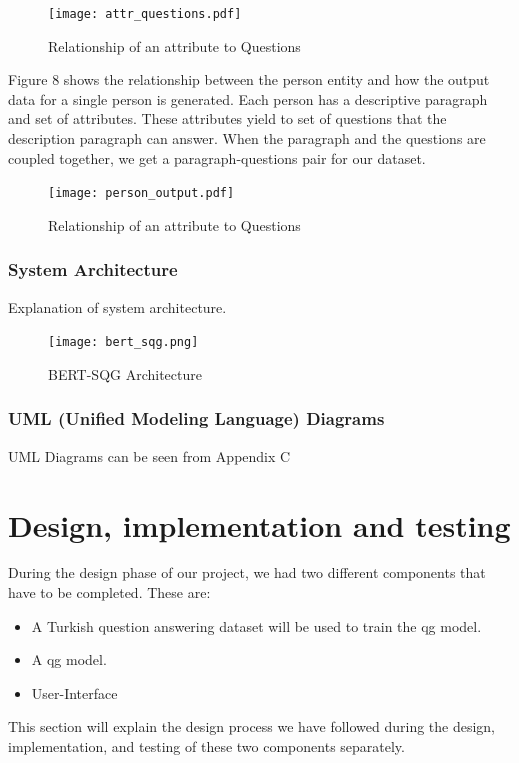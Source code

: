 \documentclass{mefsdp}
\begin{document}
	\begin{figure}[h]
		\centering
		\texttt{[image: attr\_questions.pdf]}
		\caption{Relationship of an attribute to Questions\label{attr-qg}}
	\end{figure}
	
	
	Figure 8 shows the relationship between the person entity and how the output data for a single person is generated. Each person has a descriptive paragraph and set of attributes. These attributes yield to set of questions that the description paragraph can answer. When the paragraph and the questions are coupled together, we get a paragraph-questions pair for our dataset. \newline \par
	
	\begin{figure}[h]
		\centering
		\texttt{[image: person\_output.pdf]}
		\caption{Relationship of an attribute to Questions}
	\end{figure}
	
	\newpage
	\subsubsection{System Architecture }
	Explanation of system architecture.
	\begin{figure}[h!]
		\centering
		\texttt{[image: bert\_sqg.png]}
		\caption{BERT-SQG Architecture \cite{chan-fan-2019-bert}\label{bertsqg-arch}}
	\end{figure}
	
	\subsubsection{UML (Unified Modeling Language) Diagrams}
	UML Diagrams can be seen from Appendix C
	
	\section{Design, implementation and testing}
	During the design phase of our project, we had two different components that have to be completed. These are:
	\begin{itemize}
		\item A Turkish question answering dataset will be used to train the \gls{qg} model.
		\item A \gls{qg} model.
		\item User-Interface
	\end{itemize}
	This section will explain the design process we have followed during the design, implementation, and testing of these two components separately.
\end{document}
